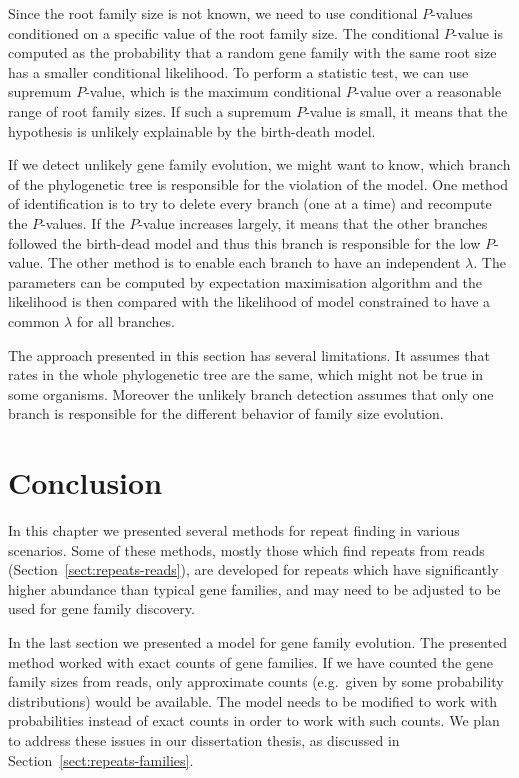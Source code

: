 Since the root family size is not known, we need to use conditional $P$-values conditioned on a specific value of the root family size.
The conditional $P$-value is computed as the probability that a random gene family with the same root size has a smaller conditional likelihood.
To perform a statistic test, we can use supremum $P$-value, which is the maximum conditional $P$-value over a reasonable range of root family sizes.
If such a supremum $P$-value is small, it means that the hypothesis is unlikely explainable by the birth-death model.

If we detect unlikely gene family evolution, we might want to know, which branch of the phylogenetic tree is responsible for the violation of the model.
One method of identification is to try to delete every branch (one at a time) and recompute the $P$-values. If the $P$-value increases largely, it means that the other branches followed the birth-dead model and thus this branch is responsible for the low $P$-value.
The other method is to enable each branch to have an independent $\lambda$. The parameters can be computed by expectation maximisation algorithm and the likelihood is then compared with the likelihood of model constrained to have a common $\lambda$ for all branches.

The approach presented in this section has several limitations. It assumes that rates in the whole phylogenetic tree are the same, which might not be true in some organisms. Moreover the unlikely branch detection assumes that only one branch is responsible for the different behavior of family size evolution.

\section{Conclusion}

In this chapter we presented several methods for repeat finding in various scenarios.
Some of these methods, mostly those which find repeats from reads (Section~\ref{sect:repeats-reads}), are developed for repeats which have significantly higher abundance than typical gene families, and may need to be adjusted to be used for gene family discovery.

In the last section we presented a model for gene family evolution. The presented method worked with exact counts of gene families. If we have counted the gene family sizes from reads, only approximate counts (e.g.\ given by some probability distributions) would be available. The model needs to be modified to work with probabilities instead of exact counts in order to work with such counts.
We plan to address these issues in our dissertation thesis, as discussed in Section~\ref{sect:repeats-families}.
